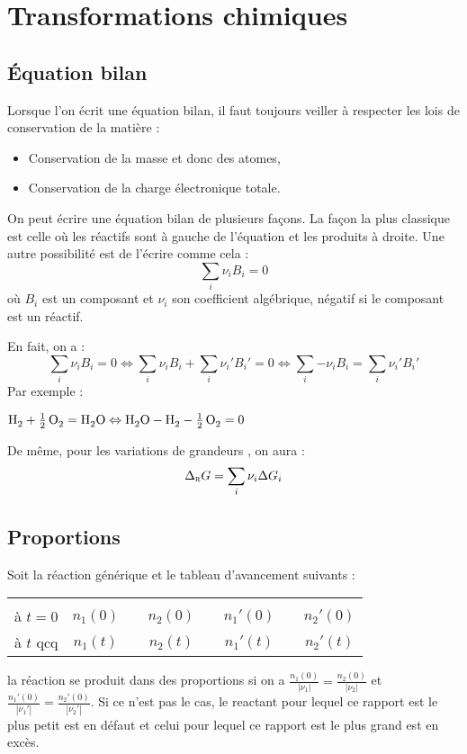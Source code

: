 \chapter{Transformations chimiques}
\section{\'Equation bilan}
Lorsque l'on écrit une équation bilan, il faut toujours veiller à respecter les lois de conservation de la matière :
\begin{itemize}
	\item Conservation de la masse et donc des atomes,
	\item Conservation de la charge électronique totale.
\end{itemize}

On peut écrire une équation bilan de plusieurs façons. La façon la plus classique est celle où les réactifs sont à gauche de l'équation et les produits à droite.
Une autre possibilité est de l'écrire comme cela :
$$\sum_i{\nu_i B_i} = 0$$
où $B_i$ est un composant et $\nu_i$ son coefficient \stoe algébrique, négatif si le composant est un réactif.


En fait, on a :
$$\sum_i{\nu_iB_i} = 0 \Leftrightarrow \sum_i{\nu_iB_i} + \sum_i{\nu_i'B_i'} = 0 \Leftrightarrow \sum_i{-\nu_iB_i} = \sum_i{\nu_i'B_i'}$$
Par exemple :
\begin{center}
	$\ce{H2 + 1/2O2} = \ce{H2O} \Leftrightarrow \ce{H2O} - \ce{H2} - \ce{1/2O2} =0$
\end{center}
De même, pour les variations de grandeurs \thermo, on aura :
$$\Delta_{\textsc{r}} G = \sum_i{\nu_i\Delta G_i}$$


\section{Proportions \stoes}

Soit la réaction générique et le tableau d'avancement suivants :
\begin{center}
	\begin{tabular}{cccccccc}
		&\reacStdTab{}\\[0.1cm]
		à $t=0$ & $n_1(0)$ && $n_2(0)$ && $n_1'(0)$ && $n_2'(0)$\\[0.1cm]
		à $t$ qcq & $n_1(t)$ && $n_2(t)$ && $n_1'(t)$ && $n_2'(t)$\\
	\end{tabular}
\end{center}
la réaction se produit dans des proportions \stoes si on a $\frac{n_1(0)}{|\nu_1|} = \frac{n_2(0)}{|\nu_2|}$ et $\frac{n_1'(0)}{|\nu_1'|} = \frac{n_2'(0)}{|\nu_2'|}$. Si ce n'est pas le cas, le \gls{reactant} pour lequel ce rapport est le plus petit est en défaut et celui pour lequel ce rapport est le plus grand est en excès.

